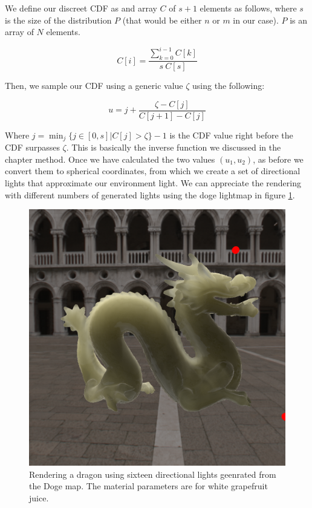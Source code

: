 We define our discreet CDF as and array $C$ of $s+1$ elements as follows, where $s$ is the size of the distribution $P$ (that would be either $n$ or $m$ in our case). $P$ is an array of $N$ elements.

$$
C[i] = \frac{\sum_{k = 0}^{i-1} C[k]}{s\ C[s]}
$$

Then, we sample our CDF using a generic value $\zeta$ using the following:

$$
u = j + \frac{\zeta - C[j]}{C[j + 1] - C[j]}
$$

Where $j = \min_j\{j \in [0,s] | C[j] > \zeta \} - 1$ is the CDF value right before the CDF surpasses $\zeta$. This is basically the inverse function we discussed in the chapter method. Once we have calculated the two values $(u_1,u_2)$, as before we convert them to spherical coordinates, from which we create a set of directional lights that approximate our environment light. We can appreciate the rendering with different numbers of generated lights using the doge lightmap in figure \ref{fig:doge_render_grape}.

\begin{figure}
\centering

\includegraphics[width=0.9 \linewidth]{images/results/skymap_1.png}
\caption{Rendering a dragon using sixteen directional lights geenrated from the Doge map. The material parameters are for white grapefruit juice.}
\label{fig:doge_render_grape}
\end{figure}

